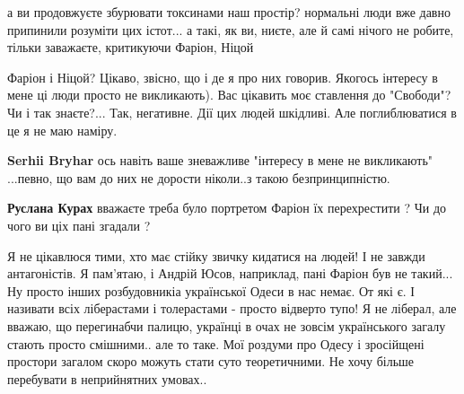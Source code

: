 \begin{itemize}
а ви продовжуєте збурювати токсинами наш простір? нормальні люди вже давно
припинили розуміти цих істот... а такі, як ви, ниєте, але й самі нічого не
робите, тільки заважаєте, критикуючи Фаріон, Ніцой

\begin{itemize}
 
Фаріон і Ніцой? Цікаво, звісно, що і де я про них говорив. Якогось інтересу в
мене ці люди просто не викликають). Вас цікавить моє ставлення до "Свободи"? Чи
і так знаєте?... Так, негативне. Дії цих людей шкідливі. Але поглиблюватися в
це я не маю наміру.

 
\textbf{Serhii Bryhar} ось навіть ваше зневажливе "інтересу в мене не викликають" ...певно, що вам до них не дорости ніколи..з такою безпринципністю.

 
\textbf{Руслана Курах} вважаєте треба було портретом Фаріон їх перехрестити ? Чи до чого ви ціх пані згадали ?

 

Я не цікавлюся тими, хто має стійку звичку кидатися на людей! І не завжди
антагоністів. Я пам'ятаю, і Андрій Юсов, наприклад, пані Фаріон був не такий...
Ну просто інших розбудовникіа української Одеси в нас немає. От які є. І
називати всіх ліберастами і толерастами - просто відверто тупо! Я не ліберал,
але вважаю, що перегинабчи палицю, українці в очах не зовсім українського
загалу стають просто смішними.. але то таке. Мої роздуми про Одесу і зросійщені
простори загалом скоро можуть стати суто теоретичними. Не хочу більше
перебувати в неприйнятних умовах..



\end{itemize}
\end{itemize}
